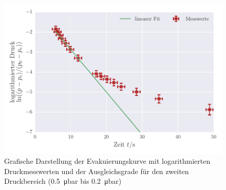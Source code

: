 \begin{figure}[!h]
 \centering
 \includegraphics[scale=0.8]{../Grafiken/Evakuierungskurve_Turbo_log_1.pdf}
 \caption{Grafische Darstellung der Evakuierungskurve mit logarithmierten Druckmesswerten und der Ausgleichsgrade für den zweiten Druckbereich (\SI{0.5}{\micro\bar} bis \SI{0.2}{\micro\bar})\label{fig:evakuierungskurve_turbo_log_1}}
 \end{figure} 